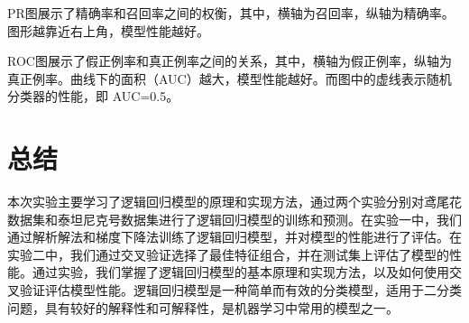 \documentclass[12pt,a4paper,oneside]{article}
\begin{document}
PR图展示了精确率和召回率之间的权衡，其中，横轴为召回率，纵轴为精确率。图形越靠近右上角，模型性能越好。

ROC图展示了假正例率和真正例率之间的关系，其中，横轴为假正例率，纵轴为真正例率。曲线下的面积（AUC）越大，模型性能越好。而图中的虚线表示随机分类器的性能，即 AUC=0.5。

\section{总结}
\qquad 本次实验主要学习了逻辑回归模型的原理和实现方法，通过两个实验分别对鸢尾花数据集和泰坦尼克号数据集进行了逻辑回归模型的训练和预测。在实验一中，我们通过解析解法和梯度下降法训练了逻辑回归模型，并对模型的性能进行了评估。在实验二中，我们通过交叉验证选择了最佳特征组合，并在测试集上评估了模型的性能。通过实验，我们掌握了逻辑回归模型的基本原理和实现方法，以及如何使用交叉验证评估模型性能。逻辑回归模型是一种简单而有效的分类模型，适用于二分类问题，具有较好的解释性和可解释性，是机器学习中常用的模型之一。
\end{document}
